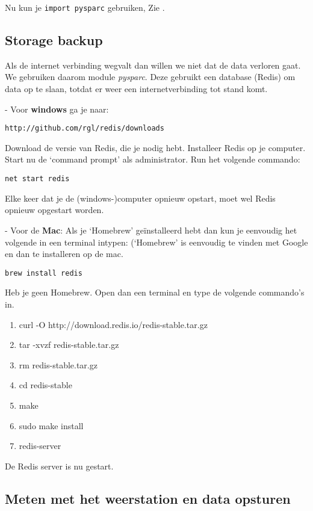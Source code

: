 Nu kun je \verb|import pysparc| gebruiken, Zie  .

\subsection{Storage backup}
Als de internet verbinding wegvalt dan willen we niet dat de data verloren gaat.
We gebruiken daarom module \emph{pysparc}. Deze gebruikt een database (Redis) om data
op te slaan, totdat er weer een internetverbinding tot stand komt. 

- Voor \textbf{windows} ga je naar:
\begin{verbatim}
http://github.com/rgl/redis/downloads
\end{verbatim}

Download de versie van Redis, die je nodig hebt.
Installeer Redis op je computer. Start nu de `command prompt' als administrator.
Run het volgende commando: 

\begin{verbatim}
net start redis
\end{verbatim}

Elke keer dat je de (windows-)computer opnieuw opstart, moet wel Redis opnieuw opgestart worden.

- Voor de \textbf{Mac}:
Als je `Homebrew' geïnstalleerd hebt dan kun je eenvoudig het volgende
in een terminal intypen: (`Homebrew' is eenvoudig te vinden met Google
en dan te installeren op de mac.

\begin{verbatim}
brew install redis
\end{verbatim}

Heb je geen Homebrew. Open dan een terminal en type de volgende commando's in. 

\begin{enumerate}
    \item curl -O http://download.redis.io/redis-stable.tar.gz
    \item tar -xvzf redis-stable.tar.gz 
    \item rm redis-stable.tar.gz 
    \item cd redis-stable 
    \item make 
    \item sudo make install
    \item redis-server
 \end{enumerate}
 
De Redis server is nu gestart. 

\subsection{Meten met het weerstation en data opsturen}

